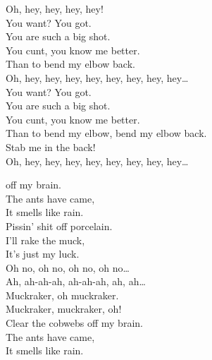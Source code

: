 
\label{album:12-bar-bruise}




Oh, hey, hey, hey, hey! \\

You want? You got. \\
You are such a big shot. \\
You cunt, you know me better. \\
Than to bend my elbow back. \\

Oh, hey, hey, hey, hey, hey, hey, hey, hey… \\

You want? You got. \\
You are such a big shot. \\
You cunt, you know me better. \\
Than to bend my elbow, bend my elbow back. \\
Stab me in the back! \\

Oh, hey, hey, hey, hey, hey, hey, hey, hey… \\




 off my brain. \\
The ants have came, \\
It smells like rain. \\

Pissin' shit off porcelain. \\
I'll rake the muck, \\
It's just my luck. \\

Oh no, oh no, oh no, oh no… \\

Ah, ah-ah-ah, ah-ah-ah, ah, ah… \\
Muckraker, oh muckraker. \\
Muckraker, muckraker, oh! \\

Clear the cobwebs off my brain. \\
The ants have came, \\
It smells like rain. \\

